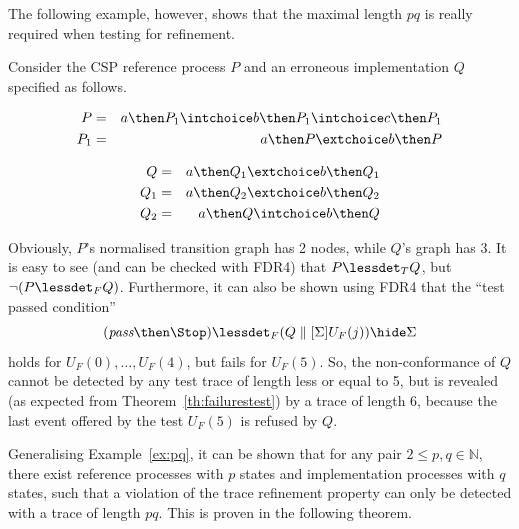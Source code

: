 The following example, however, shows that the maximal length $pq$ is really
required when testing for refinement.
\begin{example}\label{ex:pq}
Consider the CSP reference process $P$ and an erroneous implementation $Q$
specified as follows.

\begin{center}
\begin{minipage}{.4\textwidth}
\begin{eqnarray*}
P & = & a \then P_1 \intchoice b \then P_1 \intchoice c \then P_1
\\
P_1 & = & a \then P \extchoice b\then P
\end{eqnarray*}
\end{minipage}
\hfill
\begin{minipage}{.4\textwidth}
\begin{eqnarray*}
Q & = & a\then Q_1 \extchoice b\then Q_1
\\
Q_1 & = & a\then Q_2 \extchoice b\then Q_2
\\
Q_2 & = & a\then Q \intchoice b\then Q
\end{eqnarray*}
\end{minipage}
\end{center}


\medskip
Obviously, $P$'s normalised transition graph has 2 nodes, while $Q$'s graph
has 3. It is easy to see (and can be checked with FDR4) that $P\lessdet_T Q$,
but $\neg(P\lessdet_F Q)$. Furthermore, it can also be shown using FDR4 that
the ``test passed condition''
\[
(\epass\then\Stop) \lessdet_F (Q\parallel[\Sigma] U_F(j))\hide \Sigma
\]
holds for $U_F(0),\dots,U_F(4)$, but fails for $U_F(5)$. So, the
non-conformance of $Q$ cannot be detected by any test trace of length less or
equal to 5, but is revealed (as expected from Theorem~\ref{th:failurestest})
by a trace of length 6, because the last event offered by the test $U_F(5)$
is refused by $Q$. \xbox
\end{example}
%
Generalising Example~\ref{ex:pq}, it can be shown that for any pair
$2\le p,q \in\mathbb{N}$,
there exist reference processes with $p$ states
and implementation processes with $q$ states, such that
a violation of the trace refinement property
can only be detected with a trace of length $pq$. This is proven in the following
theorem.

